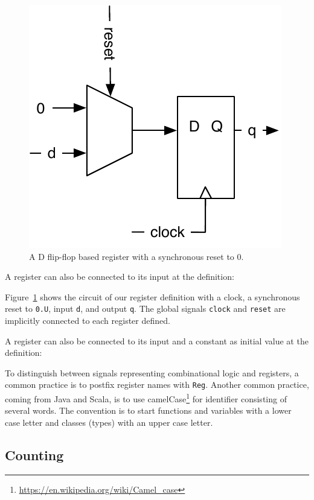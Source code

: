 \documentclass[%
    10pt,
    headinclude, footexclude,
    openright, %
    notitlepage,
    cleardoubleempty,
    headsepline,
    pointlessnumbers,
    bibtotoc, idxtotoc,
    ]{scrbook}
\newcommand{\code}[1]{{\small{\texttt{#1}}}}
\newcommand{\scale}{0.7}
\newcommand{\myref}[2]{\href{#1}{#2}}
\renewcommand{\myref}[2]{{#2}{\footnote{\url{#1}}}}
\begin{document}
\begin{figure}
  \centering
  \includegraphics[scale=\scale]{figures/register-reset-0}
  \caption{A D flip-flop based register with a synchronous reset to 0.}
  \label{fig:register-reset-0}
\end{figure}

\noindent A register can also be connected to its input at the definition:


Figure~\ref{fig:register-reset-0} shows the circuit of our register definition with
a clock, a synchronous reset to \code{0.U}, input \code{d}, and output \code{q}.
The global signals \code{clock} and \code{reset} are implicitly connected to
each register defined.

\noindent A register can also be connected to its input and a constant as
initial value at the definition:


\noindent To distinguish between signals representing combinational logic and registers,
a common practice is to postfix register names with \code{Reg}.
Another common practice, coming from Java and Scala, is to use
\myref{https://en.wikipedia.org/wiki/Camel_case}{camelCase} for
identifier consisting of several words. The convention is to start
functions and variables with a lower case letter and classes (types) with
an upper case letter.

\subsection{Counting}
\end{document}
